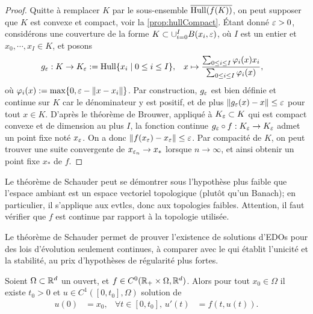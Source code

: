 \begin{proof}
Quitte à remplacer $K$ par le sous-ensemble $\overline {\operatorname{Hull}(f(K))}$, on peut supposer que $K$ est convexe et compact, voir la \cref{prop:hullCompact}.
Étant donné $\varepsilon>0$, considérons une couverture de la forme $K \subset \cup_{i=0}^I B(x_i, \varepsilon)$, où $I$ est un entier et $x_0,\cdots,x_I \in K$, et posons 
\begin{align*}
	g_\varepsilon : K &\to K_\varepsilon := \operatorname{Hull}\{x_i \mid 0 \leq i \leq I\}, &
	x &\mapsto \frac{\sum_{0 \leq i \leq I} \varphi_i(x) x_i}{\sum_{0 \leq i \leq I} \varphi_i(x)}, 
\end{align*}
où $\varphi_i(x) := \max \{0, \varepsilon-\|x - x_i\|\}$.
Par construction, $g_\varepsilon$ est bien définie et continue sur $K$ car le dénominateur y est positif, et de plus $\|g_\varepsilon(x)-x\| \leq \varepsilon$ pour tout $x \in K$. 
D'après le théorème de Brouwer, appliqué à $K_\varepsilon \subset K$ qui est compact convexe et de dimension au plus $I$, la fonction continue $g_\varepsilon \circ f : K_\varepsilon \to K_\varepsilon$ admet un point fixe noté $x_\varepsilon$. On a donc $\|f(x_\varepsilon)-x_\varepsilon\| \leq \varepsilon$. Par compacité de $K$, on peut trouver une suite convergente de $x_{\varepsilon_n} \to x_*$ lorsque $n \to \infty$, et ainsi obtenir un point fixe $x_*$ de $f$. 
\end{proof}

\begin{remark}
\label{rem:SchauderEvt}
Le théorème de Schauder peut se démontrer sous l'hypothèse plus faible que l'espace ambiant est un espace vectoriel topologique (plutôt qu'un Banach); en particulier, il s'applique aux evtlcs, donc aux topologies faibles. 
Attention, il faut vérifier que $f$ est continue par rapport à la topologie utilisée. 
\end{remark}


Le théorème de Schauder permet de prouver l'existence de solutions d'EDOs pour des lois d'évolution seulement continues, à comparer avec le  qui établit l'unicité et la stabilité, au prix d'hypothèses de régularité plus fortes.
\begin{theorem}
\label{th:CauchyPeano}
%
	Soient $\Omega \subset \mathbb{R}^d$ un ouvert, et $f\in C^0(\mathbb{R}_+ \times \Omega, \mathbb{R}^d)$. Alors pour tout $x_0 \in \Omega$ il existe $t_0 > 0$ et $u \in C^1([0,t_0],\Omega)$ solution de 
	\begin{align}
	\label{eq:PeanoEDO}
		u(0) &= x_0,&
		\forall t \in [0,t_0],\, u'(t) &= f(t,u(t)).
	\end{align}
\end{theorem}

